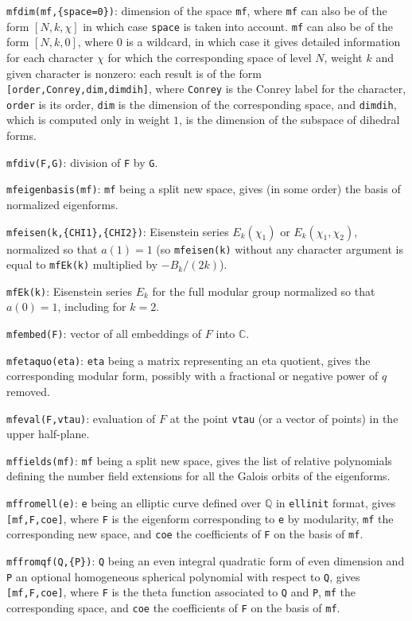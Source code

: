 \documentclass[11pt]{article}
\newcommand{\Q}{{\mathbb Q}}
\newcommand{\C}{{\mathbb C}}
\def\kbd#1{{\tt #1}}
\begin{document}
\kbd{mfdim(mf,\{space=0\})}: dimension of the space \kbd{mf}, where \kbd{mf}
can also be of the form $[N,k,\chi]$ in which case \kbd{space} is taken into
account. \kbd{mf} can also be of the form $[N,k,0]$, where $0$ is a wildcard,
in which case it gives detailed information for each character $\chi$
for which the corresponding space of level $N$, weight $k$ and given
character is nonzero: each result is of the form
\kbd{[order,Conrey,dim,dimdih]}, where \kbd{Conrey} is the
Conrey label for the character, \kbd{order} is its order, \kbd{dim} is
the dimension of the corresponding space, and \kbd{dimdih}, which is
computed only in weight $1$, is the dimension of the subspace of dihedral
forms.

\kbd{mfdiv(F,G)}: division of \kbd{F} by \kbd{G}.

\kbd{mfeigenbasis(mf)}: \kbd{mf} being a split new space, gives (in some order)
the basis of normalized eigenforms.

\kbd{mfeisen(k,\{CHI1\},\{CHI2\})}: Eisenstein series $E_k(\chi_1)$ or
$E_k(\chi_1,\chi_2)$, normalized so that $a(1)=1$ (so \kbd{mfeisen(k)} without
any character argument is equal to \kbd{mfEk(k)} multiplied by $-B_k/(2k)$).

\kbd{mfEk(k)}: Eisenstein series $E_k$ for the full modular group normalized
so that $a(0)=1$, including for $k=2$.

\kbd{mfembed(F)}: vector of all embeddings of $F$ into $\C$.

\kbd{mfetaquo(eta)}: \kbd{eta} being a matrix representing an eta quotient,
gives the corresponding modular form, possibly with a fractional or negative
power of $q$ removed.

\kbd{mfeval(F,vtau)}: evaluation of $F$ at the point \kbd{vtau} (or a
vector of points) in the upper half-plane.

\kbd{mffields(mf)}: \kbd{mf} being a split new space, gives the list of
relative polynomials defining the number field extensions for all the Galois
orbits of the eigenforms.

\kbd{mffromell(e)}: \kbd{e} being an elliptic curve defined over $\Q$ in
\kbd{ellinit} format, gives \kbd{[mf,F,coe]}, where \kbd{F} is the eigenform
corresponding to \kbd{e} by modularity, \kbd{mf} the corresponding new space,
and \kbd{coe} the coefficients of \kbd{F} on the basis of \kbd{mf}.

\kbd{mffromqf(Q,\{P\})}: \kbd{Q} being an even integral quadratic form of even
dimension and \kbd{P} an optional homogeneous spherical polynomial with
respect to \kbd{Q}, gives \kbd{[mf,F,coe]}, where \kbd{F} is the theta
function associated to \kbd{Q} and \kbd{P}, \kbd{mf} the corresponding space,
and \kbd{coe} the coefficients of \kbd{F} on the basis of \kbd{mf}.
\end{document}
